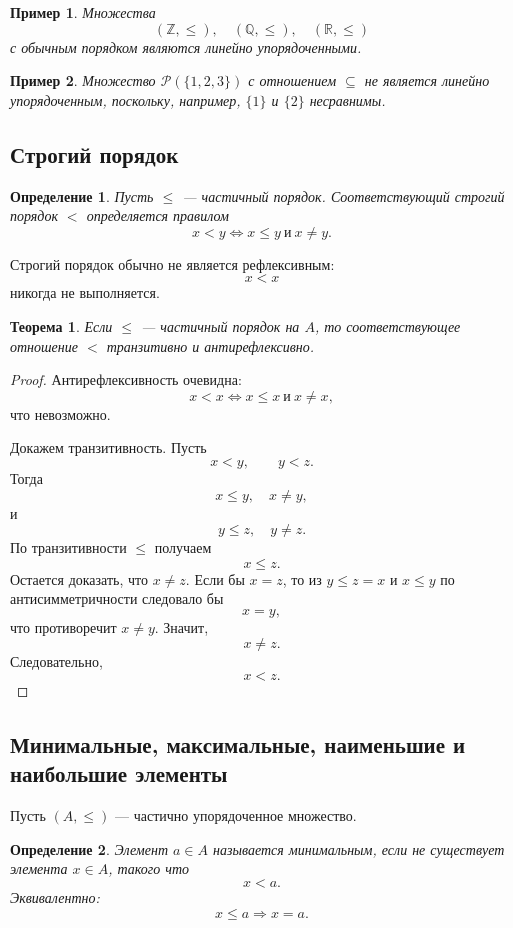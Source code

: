 \documentclass[12pt,a4paper]{article}
\newtheorem{definition}{Определение}
\newtheorem{theorem}{Теорема}
\newtheorem{example}{Пример}
\begin{document}
\begin{example}
Множества
\[
(\mathbb Z,\leq),\quad (\mathbb Q,\leq),\quad (\mathbb R,\leq)
\]
с обычным порядком являются линейно упорядоченными.
\end{example}

\begin{example}
Множество $\mathcal P(\{1,2,3\})$ с отношением $\subseteq$ не является линейно упорядоченным, поскольку, например, $\{1\}$ и $\{2\}$ несравнимы.
\end{example}

\subsection{Строгий порядок}

\begin{definition}
Пусть $\leq$ --- частичный порядок.
Соответствующий \emph{строгий порядок} $<$ определяется правилом
\[
x<y\iff x\leq y\ \text{и}\ x\ne y.
\]
\end{definition}

Строгий порядок обычно не является рефлексивным:
\[
x<x
\]
никогда не выполняется.

\begin{theorem}
Если $\leq$ --- частичный порядок на $A$, то соответствующее отношение $<$ транзитивно и антирефлексивно.
\end{theorem}

\begin{proof}
Антирефлексивность очевидна:
\[
x<x
\iff
x\leq x\ \text{и}\ x\ne x,
\]
что невозможно.

Докажем транзитивность. Пусть
\[
x<y,\qquad y<z.
\]
Тогда
\[
x\leq y,\quad x\ne y,
\]
и
\[
y\leq z,\quad y\ne z.
\]
По транзитивности $\leq$ получаем
\[
x\leq z.
\]
Остается доказать, что $x\ne z$.
Если бы $x=z$, то из $y\leq z=x$ и $x\leq y$ по антисимметричности следовало бы
\[
x=y,
\]
что противоречит $x\ne y$.
Значит,
\[
x\ne z.
\]
Следовательно,
\[
x<z.
\]
\end{proof}

\subsection{Минимальные, максимальные, наименьшие и наибольшие элементы}

Пусть $(A,\leq)$ --- частично упорядоченное множество.

\begin{definition}
Элемент $a\in A$ называется \emph{минимальным}, если не существует элемента $x\in A$, такого что
\[
x<a.
\]
Эквивалентно:
\[
x\leq a\Rightarrow x=a.
\]
\end{definition}
\end{document}
